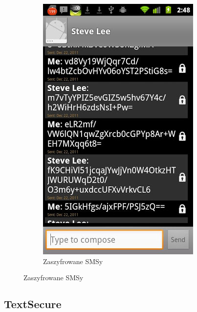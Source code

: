 \documentclass[xcolor=table]{beamer}
\begin{document}
\begin{frame}
\begin{center}
\begin{figure}
\begin{subfigure}[b]{0.4\textwidth}
              \includegraphics[width=\textwidth]{uText2}
              \caption{Zaszyfrowane SMSy}
            \end{subfigure}       
        \end{figure}
      \end{center}
\end{frame}


\subsection{TextSecure}
\end{document}
